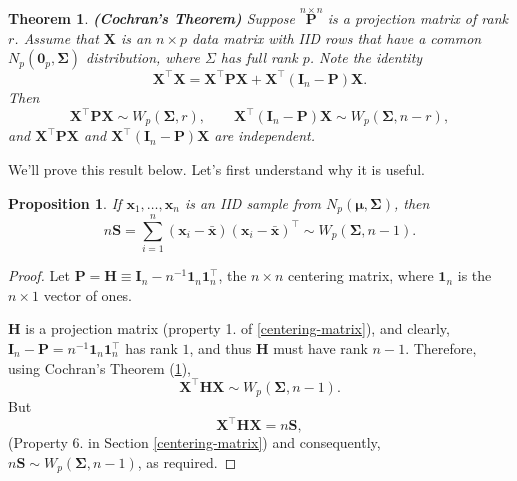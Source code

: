 \documentclass[
]{book}
\newtheorem{theorem}{Theorem}[chapter]
\newtheorem{proposition}{Proposition}[chapter]
\theoremstyle{definition}
\theoremstyle{definition}
\theoremstyle{definition}
\theoremstyle{definition}
\theoremstyle{remark}
\begin{document}
\begin{theorem}
\protect\hypertarget{thm:six11}{}\label{thm:six11}\textbf{(Cochran's Theorem)} Suppose \(\stackrel{n \times n}{\mathbf P}\) is a projection matrix of rank \(r\). Assume that \(\mathbf X\) is an \(n \times p\) data matrix with IID rows that have a common \(N_p({\mathbf 0}_p, \boldsymbol{\Sigma})\) distribution, where \(\Sigma\) has full rank \(p\). Note the identity
\begin{equation}
\mathbf X^\top \mathbf X= \mathbf X^\top {\mathbf P} \mathbf X+ \mathbf X^\top ({\mathbf I}_n -{\mathbf P})\mathbf X.
\label{eq:Cochran1}
\end{equation}
Then
\begin{equation}
\mathbf X^\top {\mathbf P} \mathbf X\sim W_p(\boldsymbol{\Sigma}, r), \qquad  \mathbf X^\top ({\mathbf I}_n -{\mathbf P})\mathbf X\sim W_p(\boldsymbol{\Sigma}, n-r),
\label{eq:Cochran2}
\end{equation}
and \(\mathbf X^\top {\mathbf P} \mathbf X\) and \(\mathbf X^\top ({\mathbf I}_n -{\mathbf P})\mathbf X\)
are independent.
\end{theorem}

We'll prove this result below. Let's first understand why it is useful.

\begin{proposition}
\protect\hypertarget{prp:six12}{}\label{prp:six12}If \(\mathbf x_1,\ldots,\mathbf x_n\) is an IID sample from \(N_p({\boldsymbol{\mu}},\boldsymbol{\Sigma})\), then
\[ n \mathbf S= \sum_{i=1}^n (\mathbf x_i - \bar{\mathbf x})(\mathbf x_i - \bar{\mathbf x})^\top \sim W_p(\boldsymbol{\Sigma},n-1).\]
\end{proposition}

\begin{proof}
Let \(\mathbf P= {\mathbf H}\equiv \mathbf I_n - n^{-1}{\mathbf 1}_n {\mathbf 1}_n^\top\), the \(n \times n\) centering matrix, where \({\mathbf 1}_n\) is the \(n \times 1\) vector of ones.

\(\mathbf H\) is a projection matrix (property 1. of \ref{centering-matrix}), and clearly, \(\mathbf I_n - \mathbf P=n^{-1} {\mathbf 1}_n {\mathbf 1}_n^\top\) has rank \(1\), and thus \(\mathbf H\) must have rank \(n-1\). Therefore, using Cochran's Theorem (\ref{thm:six11}),
\[
\mathbf X^\top \mathbf H\mathbf X\sim W_p(\boldsymbol{\Sigma}, n-1).
\]
But\\
\[\mathbf X^\top \mathbf H\mathbf X=n\mathbf S,\]
(Property 6. in Section \ref{centering-matrix})
and consequently, \(n\mathbf S\sim W_p(\boldsymbol{\Sigma}, n-1)\), as required.
\end{proof}
\end{document}

